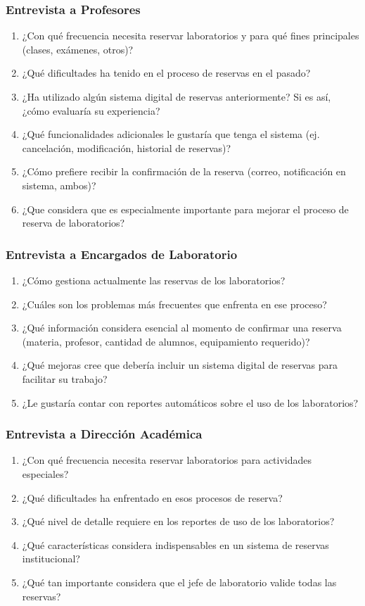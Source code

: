 \documentclass[12pt, a4paper]{article}
\begin{document}
\subsubsection*{Entrevista a Profesores}
\begin{enumerate}
\item ¿Con qué frecuencia necesita reservar laboratorios y para qué fines principales (clases, exámenes, otros)?
\item ¿Qué dificultades ha tenido en el proceso de reservas en el pasado?
\item ¿Ha utilizado algún sistema digital de reservas anteriormente? Si es así, ¿cómo evaluaría su experiencia?
\item ¿Qué funcionalidades adicionales le gustaría que tenga el sistema (ej. cancelación, modificación, historial de reservas)?
\item ¿Cómo prefiere recibir la confirmación de la reserva (correo, notificación en sistema, ambos)?
\item ¿Que considera que es especialmente importante para mejorar el proceso de reserva de laboratorios?
\end{enumerate}

\subsubsection*{Entrevista a Encargados de Laboratorio}
\begin{enumerate}
\item ¿Cómo gestiona actualmente las reservas de los laboratorios?
\item ¿Cuáles son los problemas más frecuentes que enfrenta en ese proceso?
\item ¿Qué información considera esencial al momento de confirmar una reserva (materia, profesor, cantidad de alumnos, equipamiento requerido)?
\item ¿Qué mejoras cree que debería incluir un sistema digital de reservas para facilitar su trabajo?
\item ¿Le gustaría contar con reportes automáticos sobre el uso de los laboratorios?
\end{enumerate}

\subsubsection*{Entrevista a Dirección Académica}
\begin{enumerate}
\item ¿Con qué frecuencia necesita reservar laboratorios para actividades especiales?
\item ¿Qué dificultades ha enfrentado en esos procesos de reserva?
\item ¿Qué nivel de detalle requiere en los reportes de uso de los laboratorios?
\item ¿Qué características considera indispensables en un sistema de reservas institucional?
\item ¿Qué tan importante considera que el jefe de laboratorio valide todas las reservas?
\end{enumerate}
\end{document}
